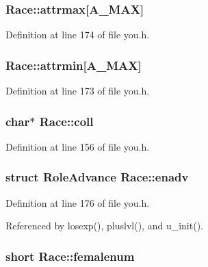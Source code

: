 \hypertarget{structRace_a5ec95f2579dea6b6c78c95ed2de00050}{
\subsubsection[{attrmax}]{ Race\+::attrmax\mbox{[}{\bf A\+\_\+\+M\+A\+X}\mbox{]}}}\label{structRace_a5ec95f2579dea6b6c78c95ed2de00050}


Definition at line 174 of file you.\+h.

\hypertarget{structRace_a65622998e211c5ee7fdb1f6e913b089b}{
\subsubsection[{attrmin}]{ Race\+::attrmin\mbox{[}{\bf A\+\_\+\+M\+A\+X}\mbox{]}}}\label{structRace_a65622998e211c5ee7fdb1f6e913b089b}


Definition at line 173 of file you.\+h.

\hypertarget{structRace_afab22eb91fe31c13e36fc36fea26b64b}{
\subsubsection[{coll}]{ char$\ast$ Race\+::coll}}\label{structRace_afab22eb91fe31c13e36fc36fea26b64b}


Definition at line 156 of file you.\+h.

\hypertarget{structRace_ad94f1e078415a0f0a5633b2522042ad2}{
\subsubsection[{enadv}]{\setlength{\rightskip}{0pt plus 5cm}struct {\bf Role\+Advance} Race\+::enadv}}\label{structRace_ad94f1e078415a0f0a5633b2522042ad2}


Definition at line 176 of file you.\+h.



Referenced by losexp(), pluslvl(), and u\+\_\+init().

\hypertarget{structRace_aa3c74c68c2bc4f8d1e63d76d5c3b217d}{
\subsubsection[{femalenum}]{\setlength{\rightskip}{0pt plus 5cm}short Race\+::femalenum}}\label{structRace_aa3c74c68c2bc4f8d1e63d76d5c3b217d}


